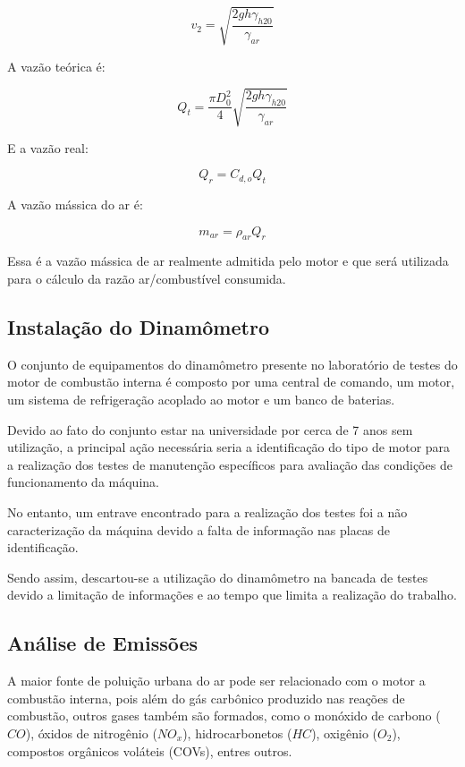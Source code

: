 \begin{equation}
	v_{2} = \sqrt{\frac{2gh\gamma _{h20}}{\gamma _{ar}}}
\end{equation}

A vazão teórica é:

\begin{equation}
	Q_{t} = \frac{\pi D_{0}^{2}}{4}\sqrt{\frac{2gh\gamma _{h20}}{\gamma _{ar}}}
\end{equation}

E a vazão real:

\begin{equation}
	Q_{r} = C_{d,o}Q_{t}
\end{equation}

A vazão mássica do ar é:

\begin{equation}
	m_{ar} = \rho _{ar}Q_{r}
\end{equation}

Essa é a vazão mássica de ar realmente admitida pelo motor  e que será utilizada para o cálculo da razão ar/combustível consumida.

\subsection{Instalação do Dinamômetro}

O conjunto de equipamentos do dinamômetro presente no laboratório de testes do motor de combustão interna é composto por uma central de comando, um motor, um sistema de refrigeração acoplado ao motor e um banco de baterias.

Devido ao fato do conjunto estar na universidade por cerca de 7 anos sem utilização, a principal ação necessária seria a identificação do tipo de motor para a realização dos testes de manutenção específicos para avaliação das condições de funcionamento da máquina.

No entanto, um entrave encontrado para a realização dos testes foi a não caracterização da máquina devido a falta de informação nas placas de identificação.

Sendo assim, descartou-se a utilização do dinamômetro na bancada de testes devido a limitação de informações e ao tempo que limita a realização do trabalho.


\subsection{Análise de Emissões}

A maior fonte de poluição urbana do ar pode ser relacionado com o motor a combustão interna, pois além do gás carbônico produzido nas reações de combustão, outros gases também são formados, como  o monóxido de carbono ($CO$), óxidos de nitrogênio ($NO_{x}$), hidrocarbonetos ($HC$), oxigênio ($O_{2}$), compostos orgânicos voláteis (COVs), entres outros.

